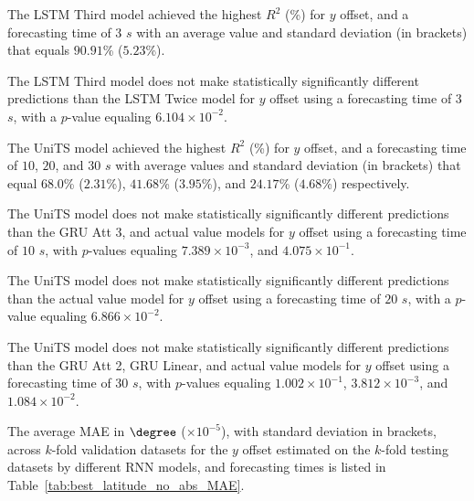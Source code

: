 The LSTM Third model achieved the highest $R^{2}$ (\%) for $y$ offset, and a forecasting time of $3$ $s$ with an average value and standard deviation (in brackets) that equals $90.91$\% ($5.23$\%).

The LSTM Third model does not make statistically significantly different predictions than the LSTM Twice model for $y$ offset using a forecasting time of $3$ $s$, with a $p$-value equaling $6.104 \times 10^{-2}$.

The UniTS model achieved the highest $R^{2}$ (\%) for $y$ offset, and a forecasting time of $10$, $20$, and $30$ $s$ with average values and standard deviation (in brackets) that equal $68.0$\% ($2.31$\%), $41.68$\% ($3.95$\%), and $24.17$\% ($4.68$\%) respectively.

The UniTS model does not make statistically significantly different predictions than the GRU Att 3, and actual value models for $y$ offset using a forecasting time of $10$ $s$, with $p$-values equaling $7.389 \times 10^{-3}$, and $4.075 \times 10^{-1}$.

The UniTS model does not make statistically significantly different predictions than the actual value model for $y$ offset using a forecasting time of $20$ $s$, with a $p$-value equaling $6.866 \times 10^{-2}$.

The UniTS model does not make statistically significantly different predictions than the GRU Att 2, GRU Linear, and actual value models for $y$ offset using a forecasting time of $30$ $s$, with $p$-values equaling $1.002 \times 10^{-1}$, $3.812 \times 10^{-3}$, and $1.084 \times 10^{-2}$.

The average MAE in $\degree$ ($\times 10^{-5}$), with standard deviation in brackets, across $k$-fold validation datasets for the $y$ offset estimated on the $k$-fold testing datasets by different RNN models, and forecasting times is listed in Table~\ref{tab:best_latitude_no_abs_MAE}.

